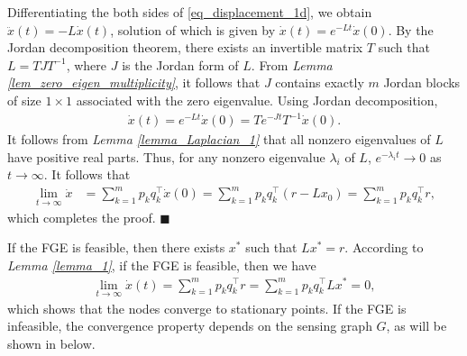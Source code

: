 \documentclass{ifacconf}
\begin{document}
\begin{pf}
Differentiating the both sides of \eqref{eq_displacement_1d}, we obtain $\ddot{x}(t)=-L\dot{x}(t)$, solution of which is given by $\dot{x}(t)=e^{-Lt}\dot{x}(0)$. By the Jordan decomposition theorem, there exists an invertible matrix $T$ such that $L = TJT^{-1}$, where $J$ is the Jordan form of $L$. From \textit{Lemma \ref{lem_zero_eigen_multiplicity}}, it follows that $J$ contains exactly $m$ Jordan blocks of size $1 \times 1$ associated with the zero eigenvalue.
Using Jordan decomposition,
\begin{align*}
    \dot{x}(t) = e^{-Lt}\dot{x}(0) = Te^{-Jt}T^{-1}\dot{x}(0).
\end{align*}
It follows from \textit{Lemma \ref{lemma_Laplacian_1}} that all nonzero eigenvalues of $L$ have positive real parts. Thus, for any nonzero eigenvalue $ \lambda_i $ of $ L $, $ e^{- \lambda_i t} \to 0 $ as $ t \to \infty $. It follows that
\begin{align*}
    \lim_{t\rightarrow \infty} \dot{x} &= \sum_{k=1}^m p_k q_k^\top \dot{x}(0) = \sum_{k=1}^m p_k q_k^\top (r-Lx_0)  = \sum_{k=1}^m p_k q_k^\top r,
\end{align*}
which completes the proof. $\blacksquare$
\end{pf}
If the FGE is feasible, then there exists $x^*$ such that $Lx^* = r$.
According to \textit{Lemma \ref{lemma_1}}, if the FGE is feasible, then we have
\begin{align*}
    \lim_{t\rightarrow \infty} \dot{x}(t) = \sum_{k=1}^m p_k q_k^\top r = \sum_{k=1}^m p_k q_k^\top Lx^* = 0,
\end{align*}
which shows that the nodes converge to stationary points. If the FGE is infeasible, the convergence property depends on the sensing graph $G$, as will be shown in below.
\end{document}
